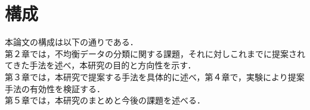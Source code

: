 \section{構成}
本論文の構成は以下の通りである．\\
第２章では，不均衡データの分類に関する課題，それに対しこれまでに提案されてきた手法を述べ，本研究の目的と方向性を示す．\\
第３章では，本研究で提案する手法を具体的に述べ，第４章で，実験により提案手法の有効性を検証する．\\
第５章では，本研究のまとめと今後の課題を述べる．\\